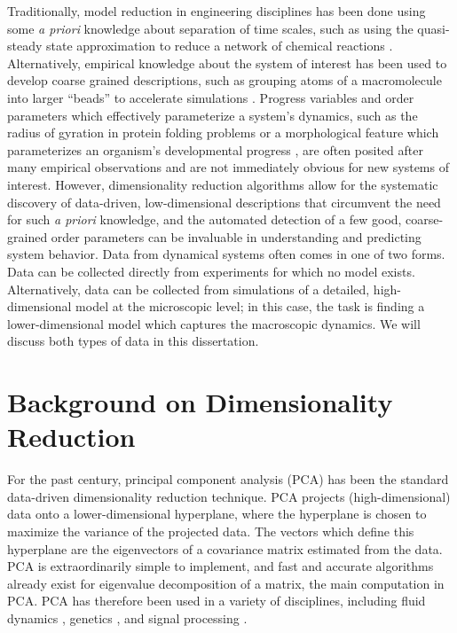 Traditionally, model reduction in engineering disciplines has been done using some {\em a priori} knowledge about separation of time scales,
such as using the quasi-steady state approximation to reduce a network of chemical reactions \cite{bowen1963singular}.
%
Alternatively, empirical knowledge about the system of interest has been used to develop coarse grained descriptions, such as grouping atoms of a macromolecule into larger ``beads'' to accelerate simulations \cite{izvekov2005systematic, monticelli2008martini, saunders2013coarse, spiga2013electrostatic}.
%
Progress variables and order parameters which effectively parameterize a system's dynamics, such as the radius of gyration in protein folding problems \cite{lazaridis1997new, kim2015systematic} or a  morphological feature which parameterizes an organism's developmental progress \cite{dubuis2013accurate, hamaratoglu2011dpp}, are often posited after many empirical observations and are not immediately obvious for new systems of interest. 
%
However, dimensionality reduction algorithms allow for the systematic discovery of data-driven, low-dimensional descriptions that circumvent the need for such {\em a priori} knowledge, and the automated detection of a few good, coarse-grained
order parameters can be invaluable in understanding and predicting system behavior.
%
%
Data from dynamical systems often comes in one of two forms. 
%
Data can be collected directly from experiments for which no model exists. 
%
Alternatively, data can be collected from simulations of a detailed, high-dimensional model at the microscopic level; in this case, the task is finding a lower-dimensional model which captures the macroscopic dynamics. 
%
We will discuss both types of data in this dissertation.

\section{Background on Dimensionality Reduction} \label{sec:background}


For the past century, principal component analysis (PCA) \cite{shlens2005tutorial} has been the standard data-driven dimensionality reduction technique.
%
PCA projects (high-dimensional) data onto a lower-dimensional hyperplane, where the hyperplane is chosen to maximize the variance of the projected data. 
%
The vectors which define this hyperplane are the eigenvectors of a covariance matrix estimated from the data. 
%
PCA is extraordinarily simple to implement, and fast and accurate algorithms already exist for eigenvalue decomposition of a matrix, the main computation in PCA.
%
PCA has therefore been used in a variety of disciplines, including fluid dynamics \cite{rowley2004model, kunisch2002galerkin}, genetics \cite{alter2000singular, troyanskaya2001missing}, and signal processing \cite{vaseghi2008advanced}. 

